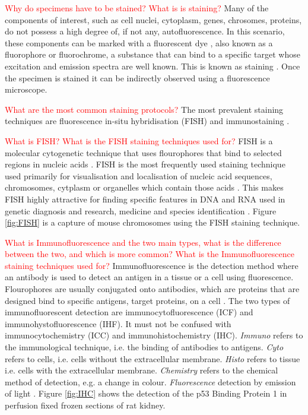 \textcolor{red}{Why do specimens have to be stained? What is is staining?}
Many of the components of interest, such as cell nuclei, cytoplasm, genes, chrosomes, proteins, do not possess a high degree of, if not any,  autofluorescence. 
In this scenario, these components can be marked with a fluorescent dye \citep{Tsien1998}, also known as a fluorophore or fluorochrome, a substance that can bind to a specific target whose excitation and emission spectra are well known. 
This is known as staining \citep{Danek2012,Hubeny2008,Dobrucki2013}. 
Once the specimen is stained it can be indirectly observed using a fluorescence microscope.

\textcolor{red}{What are the most common staining protocols?}
The most prevalent staining techniques are fluorescence in-situ hybridisation (FISH) and immunostaining \citep{Danek2012,Fatima2008,Kozubek2001_2,Theodosiou2007}.

\begin{definition}
	\textcolor{red}{What is FISH?	What is the FISH staining techniques used for?}
	FISH is a molecular cytogenetic technique that uses flourophores that bind to selected regions in nucleic acids \citep{Danek2012,Fatima2008}.
	FISH is the most frequently used staining technique used primarily for visualisation and localisation of nucleic acid sequences, chromosomes, cytplasm or organelles which contain those acids \citep{Hubeny2008}.
	This makes FISH highly attractive for finding specific features in DNA and RNA used in genetic diagnosis and research, medicine and species identification \citep{Amann2008,Fatima2008}.
	Figure \ref{fig:FISH} is a capture of mouse chromosomes using the FISH staining technique.
\end{definition}

\begin{definition}[Immunostaining]
	\textcolor{red}{What is Immunofluorescence and the two main types, what is the difference between the two, and which is more common? What is the Immunofluorescence staining techniques used for?}
	Immunofluorescence is the detection method where an antibody is used to detect an antigen in a tissue or a cell using fluorescence. Flourophores are usually conjugated onto antibodies, which are proteins that are designed bind to specific antigens, target proteins, on a cell \citep{CudeBurke2014}.
	The two types of immunofluorescent detection are immunocytofluorescence (ICF) and immunohystofluorescence (IHF).
	It must not be confused with immunocytochemistry (ICC) and immunohistochemistry (IHC).
	\textit{Immuno} refers to the immunological technique, i.e. the binding of antibodies to antigens.
	\textit{Cyto} refers to cells, i.e. cells without the extracellular membrane.
	\textit{Histo} refers to tissue i.e. cells with the extracellular membrane.
	\textit{Chemistry} refers to the chemical method of detection, e.g. a change in colour.
	\textit{Fluorescence} detection by emission of light \citep{Katikireddy2011}.
	Figure \ref{fig:IHC} shows the detection of the p53 Binding Protein 1 in perfusion fixed frozen sections of rat kidney.
\end{definition}


